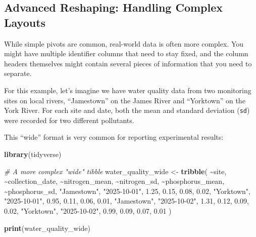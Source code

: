 \documentclass[
  11pt,
]{article}
\newenvironment{Shaded}{\begin{snugshade}}{\end{snugshade}}
\newcommand{\CommentTok}[1]{\textcolor[rgb]{0.56,0.35,0.01}{\textit{#1}}}
\newcommand{\FloatTok}[1]{\textcolor[rgb]{0.00,0.00,0.81}{#1}}
\newcommand{\FunctionTok}[1]{\textcolor[rgb]{0.13,0.29,0.53}{\textbf{#1}}}
\newcommand{\NormalTok}[1]{#1}
\newcommand{\OtherTok}[1]{\textcolor[rgb]{0.56,0.35,0.01}{#1}}
\newcommand{\SpecialCharTok}[1]{\textcolor[rgb]{0.81,0.36,0.00}{\textbf{#1}}}
\newcommand{\StringTok}[1]{\textcolor[rgb]{0.31,0.60,0.02}{#1}}
\begin{document}
\subsection{Advanced Reshaping: Handling Complex
Layouts}\label{advanced-reshaping-handling-complex-layouts}

While simple pivots are common, real-world data is often more complex.
You might have multiple identifier columns that need to stay fixed, and
the column headers themselves might contain several pieces of
information that you need to separate.

For this example, let's imagine we have water quality data from two
monitoring sites on local rivers, ``Jamestown'' on the James River and
``Yorktown'' on the York River. For each site and date, both the mean
and standard deviation (\texttt{sd}) were recorded for two different
pollutants.

This ``wide'' format is very common for reporting experimental results:

\begin{Shaded}
\begin{Highlighting}[]
\FunctionTok{library}\NormalTok{(tidyverse)}

\CommentTok{\# A more complex "wide" tibble}
\NormalTok{water\_quality\_wide }\OtherTok{\textless{}{-}} \FunctionTok{tribble}\NormalTok{(}
  \SpecialCharTok{\textasciitilde{}}\NormalTok{site,       }\SpecialCharTok{\textasciitilde{}}\NormalTok{collection\_date, }\SpecialCharTok{\textasciitilde{}}\NormalTok{nitrogen\_mean, }\SpecialCharTok{\textasciitilde{}}\NormalTok{nitrogen\_sd, }\SpecialCharTok{\textasciitilde{}}\NormalTok{phosphorus\_mean, }\SpecialCharTok{\textasciitilde{}}\NormalTok{phosphorus\_sd,}
  \StringTok{"Jamestown"}\NormalTok{, }\StringTok{"2025{-}10{-}01"}\NormalTok{,     }\FloatTok{1.25}\NormalTok{,           }\FloatTok{0.15}\NormalTok{,         }\FloatTok{0.08}\NormalTok{,             }\FloatTok{0.02}\NormalTok{,}
  \StringTok{"Yorktown"}\NormalTok{,  }\StringTok{"2025{-}10{-}01"}\NormalTok{,     }\FloatTok{0.95}\NormalTok{,           }\FloatTok{0.11}\NormalTok{,         }\FloatTok{0.06}\NormalTok{,             }\FloatTok{0.01}\NormalTok{,}
  \StringTok{"Jamestown"}\NormalTok{, }\StringTok{"2025{-}10{-}02"}\NormalTok{,     }\FloatTok{1.31}\NormalTok{,           }\FloatTok{0.12}\NormalTok{,         }\FloatTok{0.09}\NormalTok{,             }\FloatTok{0.02}\NormalTok{,}
  \StringTok{"Yorktown"}\NormalTok{,  }\StringTok{"2025{-}10{-}02"}\NormalTok{,     }\FloatTok{0.99}\NormalTok{,           }\FloatTok{0.09}\NormalTok{,         }\FloatTok{0.07}\NormalTok{,             }\FloatTok{0.01}
\NormalTok{)}

\FunctionTok{print}\NormalTok{(water\_quality\_wide)}
\end{Highlighting}
\end{Shaded}
\end{document}
